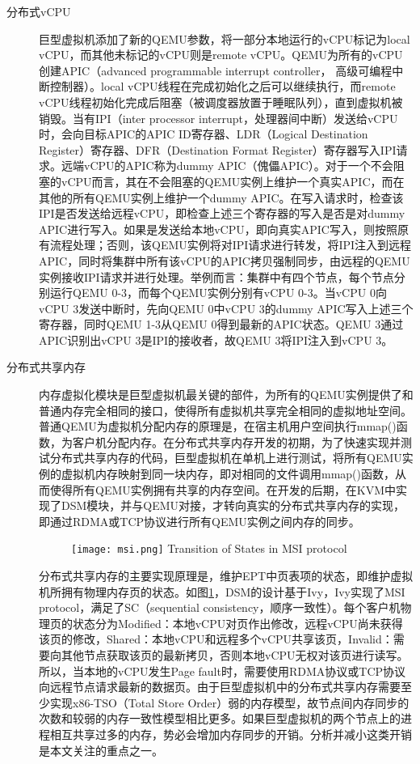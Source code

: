 \begin{description}
    \item[分布式vCPU] 巨型虚拟机添加了新的QEMU参数，将一部分本地运行的vCPU标记为local vCPU，而其他未标记的vCPU则是remote vCPU。QEMU为所有的vCPU创建APIC（advanced programmable interrupt controller， 高级可编程中断控制器）。local vCPU线程在完成初始化之后可以继续执行，而remote vCPU线程初始化完成后阻塞（被调度器放置于睡眠队列），直到虚拟机被销毁。当有IPI（inter processor interrupt，处理器间中断）发送给vCPU时，会向目标APIC的APIC ID寄存器、LDR（Logical Destination Register）寄存器、DFR（Destination Format Register）寄存器写入IPI请求。远端vCPU的APIC称为dummy APIC（傀儡APIC）。对于一个不会阻塞的vCPU而言，其在不会阻塞的QEMU实例上维护一个真实APIC，而在其他的所有QEMU实例上维护一个dummy APIC。在写入请求时，检查该IPI是否发送给远程vCPU，即检查上述三个寄存器的写入是否是对dummy APIC进行写入。如果是发送给本地vCPU，即向真实APIC写入，则按照原有流程处理；否则，该QEMU实例将对IPI请求进行转发，将IPI注入到远程APIC，同时将集群中所有该vCPU的APIC拷贝强制同步，由远程的QEMU实例接收IPI请求并进行处理。举例而言：集群中有四个节点，每个节点分别运行QEMU 0-3，而每个QEMU实例分别有vCPU 0-3。当vCPU 0向vCPU 3发送中断时，先向QEMU 0中vCPU 3的dummy APIC写入上述三个寄存器，同时QEMU 1-3从QEMU 0得到最新的APIC状态。QEMU 3通过APIC识别出vCPU 3是IPI的接收者，故QEMU 3将IPI注入到vCPU 3。
    \item[分布式共享内存] 内存虚拟化模块是巨型虚拟机最关键的部件，为所有的QEMU实例提供了和普通内存完全相同的接口，使得所有虚拟机共享完全相同的虚拟地址空间。普通QEMU为虚拟机分配内存的原理是，在宿主机用户空间执行mmap()函数，为客户机分配内存。在分布式共享内存开发的初期，为了快速实现并测试分布式共享内存的代码，巨型虚拟机在单机上进行测试，将所有QEMU实例的虚拟机内存映射到同一块内存，即对相同的文件调用mmap()函数，从而使得所有QEMU实例拥有共享的内存空间。在开发的后期，在KVM中实现了DSM模块，并与QEMU对接，才转向真实的分布式共享内存的实现，即通过RDMA或TCP协议进行所有QEMU实例之间内存的同步。

    \begin{figure}[!htp]
      \centering
      \texttt{[image: msi.png]}
        {Transition of States in MSI protocol}
      \label{fig:MSI}
    \end{figure}
    
    分布式共享内存的主要实现原理是，维护EPT中页表项的状态，即维护虚拟机所拥有物理内存页的状态。如图\ref{fig:MSI}，DSM的设计基于Ivy\cite{ivy}，Ivy实现了MSI protocol，满足了SC（sequential consistency，顺序一致性）。每个客户机物理页的状态分为Modified：本地vCPU对页作出修改，远程vCPU尚未获得该页的修改，Shared：本地vCPU和远程多个vCPU共享该页，Invalid：需要向其他节点获取该页的最新拷贝，否则本地vCPU无权对该页进行读写。所以，当本地的vCPU发生Page fault时，需要使用RDMA协议或TCP协议向远程节点请求最新的数据页。由于巨型虚拟机中的分布式共享内存需要至少实现x86-TSO（Total Store Order）\cite{tso}弱的内存模型，故节点间内存同步的次数和较弱的内存一致性模型相比更多。如果巨型虚拟机的两个节点上的进程相互共享过多的内存，势必会增加内存同步的开销。分析并减小这类开销是本文关注的重点之一。
    

\end{description}
